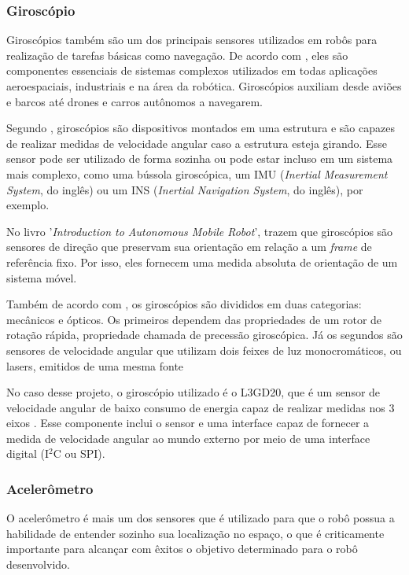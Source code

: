 \documentclass[acronym, symbols]{fei}
\begin{document}
			\subsubsection{Giroscópio}
			
				Giroscópios também são um dos principais sensores utilizados em robôs para realização de tarefas básicas como navegação. De acordo com \textcite{jeremydingman2020}, eles são componentes essenciais de sistemas complexos utilizados em todas aplicações aeroespaciais, industriais e na área da robótica. Giroscópios auxiliam desde aviões e barcos até drones e carros autônomos a navegarem.
				
				Segundo \textcite{s17102284}, giroscópios são dispositivos montados em uma estrutura e são capazes de realizar medidas de velocidade angular caso a estrutura esteja girando. Esse sensor pode ser utilizado de forma sozinha ou pode estar incluso em um sistema mais complexo, como uma bússola giroscópica, um IMU (\textit{Inertial Measurement System}, do inglês) ou um INS (\textit{Inertial Navigation System}, do inglês), por exemplo.
				
				No livro '\textit{Introduction to Autonomous Mobile Robot}', \textcite{siegwart2011introduction} trazem que giroscópios são sensores de direção que preservam sua orientação em relação a um \textit{frame} de referência fixo. Por isso, eles fornecem uma medida absoluta de orientação de um sistema móvel. 
				
				Também de acordo com \textcite{siegwart2011introduction}, os giroscópios são divididos em duas categorias: mecânicos e ópticos. Os primeiros dependem das propriedades de um rotor de rotação rápida, propriedade chamada de precessão giroscópica. Já os segundos são sensores de velocidade angular que utilizam dois feixes de luz monocromáticos, ou lasers, emitidos de uma mesma fonte
				
				No caso desse projeto, o giroscópio utilizado é o L3GD20, que é um sensor de velocidade angular de baixo consumo de energia capaz de realizar medidas nos 3 eixos \cite{datasheet_gyro}. Esse componente inclui o sensor e uma interface capaz de fornecer a medida de velocidade angular ao mundo externo por meio de uma interface digital (I$^2$C ou SPI).
			
			\subsubsection{Acelerômetro}
			
				O acelerômetro é mais um dos sensores que é utilizado para que o robô possua a habilidade de entender sozinho sua localização no espaço, o que é criticamente importante para alcançar com êxitos o objetivo determinado para o robô desenvolvido.
			
\end{document}
